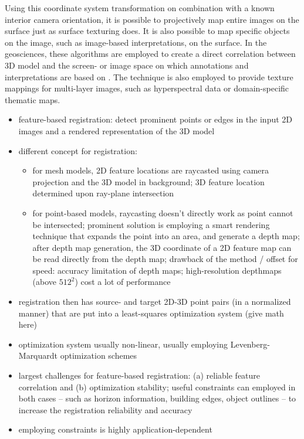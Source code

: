 \documentclass[review]{elsarticle}
\begin{document}
Using this coordinate system transformation on combination with a known interior camera orientation, it is possible to projectively map entire images on the surface just as surface texturing does. It is also possible to map specific objects on the image, such as image-based interpretations, on the surface. In the geosciences, these algorithms are employed to create a direct correlation between 3D model and the screen- or image space on which annotations and interpretations are based on \cite{Kehl2016_ISPRS}. The technique is also employed to provide texture mappings for multi-layer images, such as hyperspectral data or domain-specific thematic maps.

\begin{itemize}
\item feature-based registration: detect prominent points or edges in the input 2D images and a rendered representation of the 3D model
\item different concept for registration: 
\begin{itemize}
\item for mesh models, 2D feature locations are raycasted using camera projection and the 3D model in background; 3D feature location determined upon ray-plane intersection
\item for point-based models, raycasting doesn't directly work as point cannot be intersected; prominent solution is employing a smart rendering technique that expands the point into an area, and generate a depth map; after depth map generation, the 3D coordinate of a 2D feature map can be read directly from the depth map; drawback of the method / offset for speed: accuracy limitation of depth maps; high-resolution depthmaps (above $512^2$) cost a lot of performance
\end{itemize}
\item registration then has source- and target 2D-3D point pairs (in a normalized manner) that are put into a least-squares optimization system (give math here)
\item optimization system usually non-linear, usually employing Levenberg-Marquardt optimization schemes \cite{Kehl2015c}
\item largest challenges for feature-based registration: (a) reliable feature correlation and (b) optimization stability; useful constraints can employed in both cases -- such as horizon information, building edges, object outlines -- to increase the registration reliability and accuracy
\item employing constraints is highly application-dependent
\end{itemize}
\end{document}
